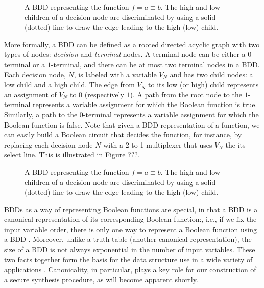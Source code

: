 \begin{figure}[h]
  \caption{A BDD representing the function $f = a \equiv b$. The high and low children of a decision node are discriminated by using a solid (dotted) line to draw the edge leading to the high (low) child.}
  \label{fig:dummy}
\end{figure}

More formally, a BDD can be defined as a rooted directed acyclic graph with two types of nodes: \emph{decision} and \emph{terminal} nodes. A terminal node can be either a $0$-terminal or a $1$-terminal, and there can be at most two terminal nodes in a BDD. Each decision node, $N$, is labeled with a variable $V_N$ and has two child nodes: a low child and a high child. The edge from $V_N$ to its low (or high) child represents an assignment of $V_N$ to $0$ (respectively $1$). A path from the root node to the $1$-terminal represents a variable assignment for which the Boolean function is true. Similarly, a path to the $0$-terminal represents a variable assignment for which the Boolean function is false. Note that given a BDD representation of a function, we can easily build a Boolean circuit that decides the function, for instance, by replacing each decision node $N$ with a 2-to-1 multiplexer that uses $V_N$ the its select line. This is illustrated in Figure ???.

\begin{figure}[h]
  \caption{A BDD representing the function $f = a \equiv b$. The high and low children of a decision node are discriminated by using a solid (dotted) line to draw the edge leading to the high (low) child.}
  \label{fig:dummy}
\end{figure}

BDDs as a way of representing Boolean functions are special, in that a BDD is a canonical representation of its corresponding Boolean function:, i.e., if we fix the input variable order, there is only one way to represent a Boolean function using a BDD \cite{}. Moreover, unlike a truth table (another canonical representation), the size of a BDD is not always exponential in the number of input variables. These two facts together form the basis for the data structure use in a wide variety of applications \cite{}. Canonicality, in particular, plays a key role for our construction of a secure synthesis procedure, as will become apparent shortly.

